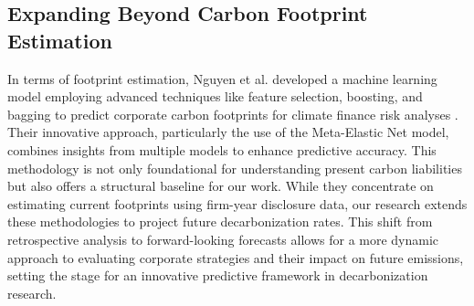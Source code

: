 \subsection{Expanding Beyond Carbon Footprint Estimation}
In terms of footprint estimation, Nguyen et al. developed a machine learning model employing advanced techniques like feature selection, boosting, and bagging to predict corporate carbon footprints for climate finance risk analyses \cite{nguyen-ml}. Their innovative approach, particularly the use of the Meta-Elastic Net model, combines insights from multiple models to enhance predictive accuracy. This methodology is not only foundational for understanding present carbon liabilities but also offers a structural baseline for our work. While they concentrate on estimating current footprints using firm-year disclosure data, our research extends these methodologies to project future decarbonization rates. This shift from retrospective analysis to forward-looking forecasts allows for a more dynamic approach to evaluating corporate strategies and their impact on future emissions, setting the stage for an innovative predictive framework in decarbonization research.


